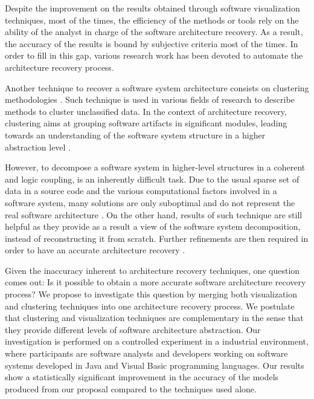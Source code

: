 \documentclass{sig-alternate-05-2015}
\begin{document}
Despite the improvement on the results obtained through software visualization techniques, most of the times, the efficiency of the methods or tools rely on the ability of the analyst in charge of the software architecture recovery. As a result, the accuracy of the results is bound by subjective criteria most of the times. In order to fill in this gap, various research work has been devoted to automate the architecture recovery process. 

Another technique to recover a software system architecture consists on clustering methodologies \cite{shtern_clustering_2012, Jain_Murty_1999, Wiggerts, mitchell_heuristic_2002}. Such technique is used in various fields of research to describe methods to cluster unclassified data.  In the context of architecture recovery, clustering aims at grouping software artifacts in significant modules, leading towards an understanding of the software system structure in a higher abstraction level \cite{shtern_clustering_2012}.

However, to decompose a software system in higher-level structures in a coherent and logic coupling, is an inherently difficult task.  Due to the usual sparse set of data in a source code and the various computational factors involved in a software system, many solutions are only suboptimal and do not represent the real software architecture \cite {mitchell_heuristic_2002}.  On the other hand, results of such technique are still helpful as they provide as a result a view of the software system decomposition, instead of reconstructing it from scratch. Further refinements are then required in order to have an accurate architecture recovery \cite{tzerpos_comprehension-driven_2001}.

Given the inaccuracy inherent to architecture recovery techniques, one question comes out:  Is it possible to obtain a more accurate software architecture recovery process? We propose to investigate this question by merging both visualization and clustering techniques into one   architecture recovery process. We postulate that clustering and visualization  techniques are complementary in the sense that they provide different levels of software architecture abstraction. Our investigation is performed on a controlled experiment in a industrial environment, where participants are software analysts and developers working on software systems developed in Java and Visual Basic programming languages. Our results show a statistically significant improvement in the accuracy of the models produced from our proposal compared to the techniques used alone.
\end{document}

